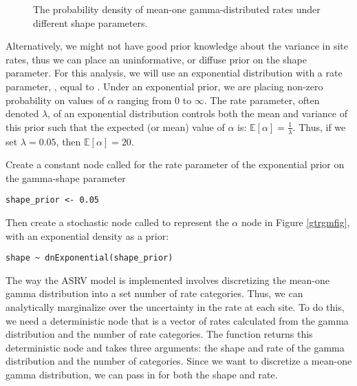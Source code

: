 \begin{figure}[h]
\centering
{}
\caption{\small The probability density of mean-one gamma-distributed rates under different shape parameters.}
\label{asrhGammaFig}
\end{figure}


Alternatively, we might not have good prior knowledge about the variance in site rates, thus we can place an uninformative, or diffuse prior on the shape parameter.
For this analysis, we will use an exponential distribution with a rate parameter, , equal to .
Under an exponential prior, we are placing non-zero probability on values of $\alpha$ ranging from 0 to $\infty$. 
The rate parameter, often denoted $\lambda$, of an exponential distribution controls both the mean and variance of this prior such that the expected (or mean) value of $\alpha$ is:
$\mathbb{E}[\alpha] = \frac{1}{\lambda}.$
Thus, if we set $\lambda=0.05$, then $\mathbb{E}[\alpha] = 20$.

Create a constant node called  for the rate parameter of the exponential prior on the gamma-shape parameter
{\tt\begin{snugshade*}
\begin{lstlisting}
shape_prior <- 0.05                                                                             
\end{lstlisting}
\end{snugshade*}}

Then create a stochastic node called  to represent the $\alpha$ node in Figure \ref{gtrgmfig}, with an exponential density as a prior:
{\tt\begin{snugshade*}
\begin{lstlisting}
shape ~ dnExponential(shape_prior)

\end{lstlisting}
\end{snugshade*}}

The way the ASRV model is implemented involves discretizing the mean-one gamma distribution into a set number of rate categories. Thus, we can analytically marginalize over the uncertainty in the rate at each site. To do this, we need a deterministic node that is a vector of rates calculated from the gamma distribution and the number of rate categories. The  function returns this deterministic node and takes three arguments: the shape and rate of the gamma distribution and the number of categories. Since we want to discretize a mean-one gamma distribution, we can pass in  for both the shape and rate.

